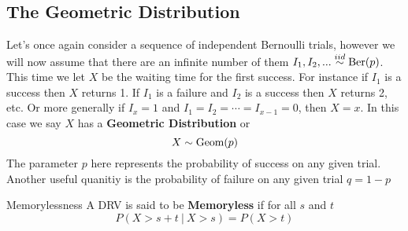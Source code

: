 \documentclass{report}
\begin{document}
\subsection{The Geometric Distribution}
    \newcommand{\geom}{\textup{Geom}}
    Let's once again consider a sequence of independent Bernoulli trials, however we will now assume that there are an infinite number of them $I_1,I_2,...\overset{iid}\sim \textup{Ber}(p)$. This time we let $X$ be the waiting time for the first success. For instance if $I_1$ is a success then $X$ returns 1. If $I_1$ is a failure and $I_2$ is a success then $X$ returns 2, etc. Or more generally if $I_x=1$ and $I_1=I_2=\cdots =I_{x-1}=0$, then $X=x$. In this case we say $X$ has a \textbf{Geometric Distribution} or
    \[
        X\sim\geom(p)
    \]
    The parameter $p$ here represents the probability of success on any given trial. Another useful quanitiy is the probability of failure on any given trial $q=1-p$
    \begin{definition}{Memorylessness}
        A DRV is said to be \textbf{Memoryless} if for all $s$ and $t$
        \[
            P(X>s+t\ |\ X>s)=P(X>t)
        \]
    \end{definition}
\end{document}
